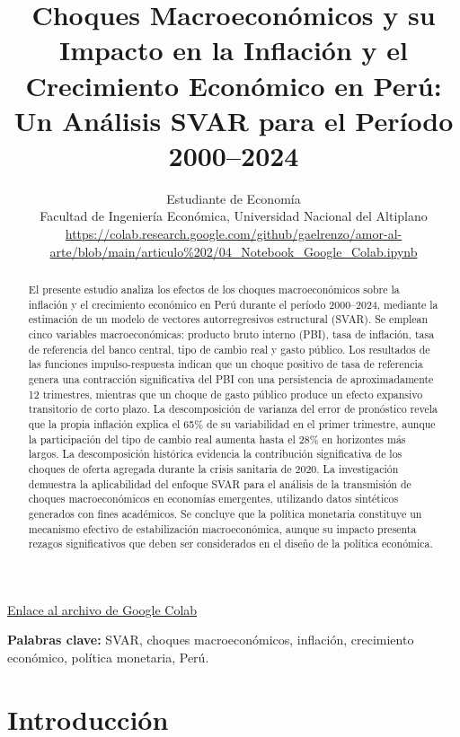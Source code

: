 \documentclass[12pt,a4paper]{article}
\title{\textbf{Choques Macroeconómicos y su Impacto en la Inflación y el Crecimiento Económico en Perú: Un Análisis SVAR para el Período 2000--2024}}
\author{
    Estudiante de Economía\\
    Facultad de Ingeniería Económica, Universidad Nacional del Altiplano\\
    \url{https://colab.research.google.com/github/gaelrenzo/amor-al-arte/blob/main/articulo\%202/04_Notebook_Google_Colab.ipynb}
}
\date{}
\begin{document}
\maketitle

\begin{center}
\href{https://colab.research.google.com/github/gaelrenzo/amor-al-arte/blob/main/articulo\%202/04_Notebook_Google_Colab.ipynb}{Enlace al archivo de Google Colab}
\end{center}

\begin{abstract}
El presente estudio analiza los efectos de los choques macroeconómicos sobre la inflación y el crecimiento económico en Perú durante el período 2000--2024, mediante la estimación de un modelo de vectores autorregresivos estructural (SVAR). Se emplean cinco variables macroeconómicas: producto bruto interno (PBI), tasa de inflación, tasa de referencia del banco central, tipo de cambio real y gasto público. Los resultados de las funciones impulso-respuesta indican que un choque positivo de tasa de referencia genera una contracción significativa del PBI con una persistencia de aproximadamente 12 trimestres, mientras que un choque de gasto público produce un efecto expansivo transitorio de corto plazo. La descomposición de varianza del error de pronóstico revela que la propia inflación explica el 65\% de su variabilidad en el primer trimestre, aunque la participación del tipo de cambio real aumenta hasta el 28\% en horizontes más largos. La descomposición histórica evidencia la contribución significativa de los choques de oferta agregada durante la crisis sanitaria de 2020. La investigación demuestra la aplicabilidad del enfoque SVAR para el análisis de la transmisión de choques macroeconómicos en economías emergentes, utilizando datos sintéticos generados con fines académicos. Se concluye que la política monetaria constituye un mecanismo efectivo de estabilización macroeconómica, aunque su impacto presenta rezagos significativos que deben ser considerados en el diseño de la política económica.
\end{abstract}

\vspace{0.5cm}
\noindent\textbf{Palabras clave:} SVAR, choques macroeconómicos, inflación, crecimiento económico, política monetaria, Perú.

\section{Introducción}
\end{document}
